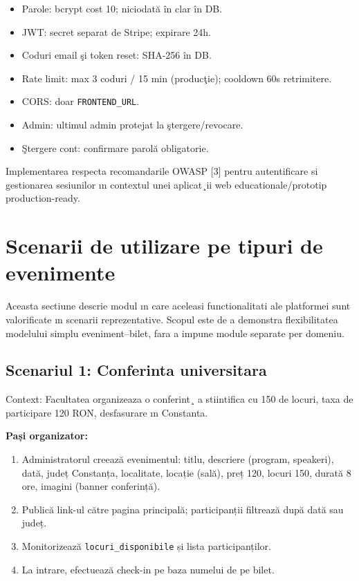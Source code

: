 \begin{itemize}
	\item Parole: bcrypt cost 10; niciodat\u a \^in clar \^in DB.
	\item JWT: secret separat de Stripe; expirare 24h.
	\item Coduri email \c si token reset: SHA-256 \^in DB.
	\item Rate limit: max 3 coduri / 15 min (produc\c tie); cooldown 60s retrimitere.
	\item CORS: doar \texttt{FRONTEND\_URL}.
	\item Admin: ultimul admin protejat la \c stergere/revocare.
	\item \c Stergere cont: confirmare parol\u a obligatorie.
\end{itemize}

Implementarea respecta recomandarile OWASP [3] pentru autentificare si gestionarea sesiunilor ın contextul unei aplicat¸ii web educationale/prototip production-ready.

\section{Scenarii de utilizare pe tipuri de evenimente}

Aceasta sectiune descrie modul ın care aceleasi functionalitati ale platformei sunt valorificate ın scenarii reprezentative. Scopul este de a demonstra flexibilitatea modelului simplu eveniment–bilet, fara a impune module separate per domeniu.

\subsection{Scenariul 1: Conferinta universitara}

Context: Facultatea organizeaza o conferint¸ a stiintifica cu 150 de locuri, taxa de participare 120 RON, desfasurare ın Constanta.

\hspace*{2ex} \textbf{Pași organizator:}
\begin{enumerate}
	\item Administratorul creează evenimentul: titlu, descriere (program, speakeri), dată, județ Constanța, localitate, locație (sală), preț 120, locuri 150, durată 8 ore, imagini (banner conferință).
	\item Publică link-ul către pagina principală; participanții filtrează după dată sau județ.
	\item Monitorizează {\tt locuri\_disponibile} și lista participanților.
	\item La intrare, efectuează check-in pe baza numelui de pe bilet.
\end{enumerate}

